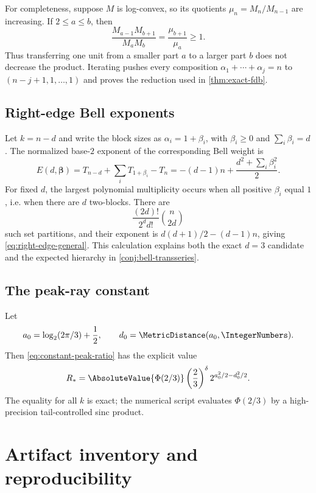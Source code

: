 \documentclass[11pt,a4paper]{article}
\theoremstyle{definition}
\theoremstyle{remark}
\begin{document}
For completeness, suppose $M$ is log-convex, so its quotients
$\mu_n=M_n/M_{n-1}$ are increasing.  If $2\le a\le b$, then
\[
 \frac{M_{a-1}M_{b+1}}{M_aM_b}
 =\frac{\mu_{b+1}}{\mu_a}\ge1.
\]
Thus transferring one unit from a smaller part $a$ to a larger part $b$ does not
decrease the product.  Iterating pushes every composition
$\alpha_1+\cdots+\alpha_j=n$ to $(n-j+1,1,\ldots,1)$ and proves the reduction used
in \cref{thm:exact-fdb}.

\subsection{Right-edge Bell exponents}

Let $k=n-d$ and write the block sizes as $\alpha_i=1+\beta_i$, with
$\beta_i\ge0$ and $\sum_i\beta_i=d$.  The normalized base-$2$ exponent of the
corresponding Bell weight is
\begin{equation}
 E(d,\boldsymbol\beta)
 =T_{n-d}+\sum_iT_{1+\beta_i}-T_n
 =-(d-1)n+\frac{d^2+\sum_i\beta_i^2}{2}.
 \label{eq:right-edge-exponent}
\end{equation}
For fixed $d$, the largest polynomial multiplicity occurs when all positive
$\beta_i$ equal $1$, i.e. when there are $d$ two-blocks.  There are
\[
  \frac{(2d)!}{2^d d!}\binom n{2d}
\]
such set partitions, and their exponent is
$d(d+1)/2-(d-1)n$, giving \eqref{eq:right-edge-general}.  This calculation explains
both the exact $d=3$ candidate and the expected hierarchy in
\cref{conj:bell-transseries}.

\subsection{The peak-ray constant}

Let
\[
  a_0=\log_2(2\pi/3)+\frac12,
  \qquad d_0=\MetricDistance(a_0,\IntegerNumbers).
\]
Then \eqref{eq:constant-peak-ratio} has the explicit value
\begin{equation}
  R_*=\AbsoluteValue{\Phi(2/3)}
  \left(\frac23\right)^\delta
  2^{a_0^2/2-d_0^2/2}.
  \label{eq:Rstar}
\end{equation}
The equality for all $k$ is exact; the numerical script evaluates
$\Phi(2/3)$ by a high-precision tail-controlled sinc product.

\section{Artifact inventory and reproducibility}
\label{app:artifact}
\end{document}
